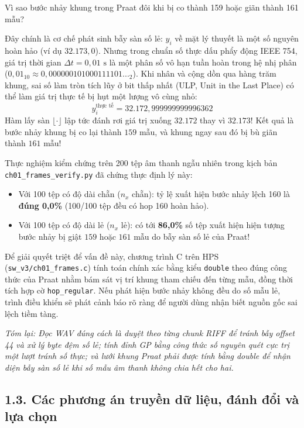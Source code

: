 \begin{thoughtqa}{Vì sao bước nhảy khung trong Praat đôi khi bị co thành 159 hoặc giãn thành 161 mẫu?}
\begin{itemize}[leftmargin=1.5em, itemsep=2pt]
\begin{equation}
    \end{equation}
    Đây chính là cơ chế phát sinh bẫy sàn số lẻ: $y_i$ về mặt lý thuyết là một số nguyên hoàn hảo (ví dụ $32.173{,}0$). Nhưng trong chuẩn số thực dấu phẩy động IEEE 754, giá trị thời gian $\Delta t = 0{,}01\text{ s}$ là một phân số vô hạn tuần hoàn trong hệ nhị phân ($0{,}01_{10} \approx 0{,}000000101000111101..._2$). Khi nhân và cộng dồn qua hàng trăm khung, sai số làm tròn tích lũy ở bit thấp nhất (ULP, Unit in the Last Place) có thể làm giá trị thực tế bị hụt một lượng vô cùng nhỏ:
    \begin{equation}
    y_i^{\text{thực tế}} = 32.172{,}999999999996362
    \end{equation}
    Hàm lấy sàn $\lfloor \cdot \rfloor$ lập tức đánh rơi giá trị xuống $32.172$ thay vì $32.173$! Kết quả là bước nhảy khung bị co lại thành $159$ mẫu, và khung ngay sau đó bị bù giãn thành $161$ mẫu!
\end{itemize}
\end{thoughtqa}

Thực nghiệm kiểm chứng trên 200 tệp âm thanh ngẫu nhiên trong kịch bản \texttt{ch01\_frames\_verify.py} đã chứng thực định lý này:
\begin{itemize}[leftmargin=1.5em, itemsep=2pt]
    \item Với 100 tệp có độ dài chẵn ($n_x$ chẵn): tỷ lệ xuất hiện bước nhảy lệch 160 là \textbf{đúng 0{,}0\%} (100/100 tệp đều có hop 160 hoàn hảo).
    \item Với 100 tệp có độ dài lẻ ($n_x$ lẻ): có tới \textbf{86{,}0\%} số tệp xuất hiện hiện tượng bước nhảy bị giật $159$ hoặc $161$ mẫu do bẫy sàn số lẻ của Praat!
\end{itemize}

Để giải quyết triệt để vấn đề này, chương trình C trên HPS (\texttt{sw\_v3/ch01\_frames.c}) tính toán chính xác bằng kiểu \texttt{double} theo đúng công thức của Praat nhằm bám sát vị trí khung tham chiếu đến từng mẫu, đồng thời tích hợp cờ \texttt{hop\_regular}. Nếu phát hiện bước nhảy không đều do số mẫu lẻ, trình điều khiển sẽ phát cảnh báo rõ ràng để người dùng nhận biết nguồn gốc sai lệch tiềm tàng.

\textit{Tóm lại: Đọc WAV đúng cách là duyệt theo từng chunk RIFF để tránh bẫy offset 44 và xử lý byte đệm số lẻ; tính đỉnh GP bằng công thức số nguyên quét cực trị một lượt tránh số thực; và lưới khung Praat phải được tính bằng double để nhận diện bẫy sàn số lẻ khi số mẫu âm thanh không chia hết cho hai.}

\subsection*{1.3. Các phương án truyền dữ liệu, đánh đổi và lựa chọn}


